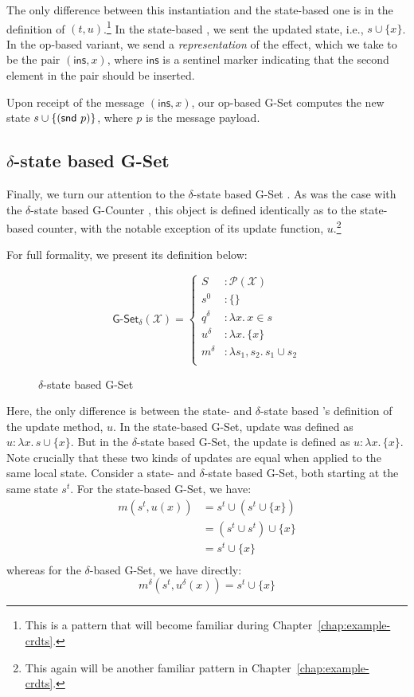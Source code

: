 The only difference between this \CRDT instantiation and the state-based one is
in the definition of $(t,u)$.\footnote{This is a pattern that will become
familiar during Chapter~\ref{chap:example-crdts}.} In the state-based \CRDT, we
sent the updated state, i.e., $s \cup \{ x \}$. In the op-based variant, we send
a \emph{representation} of the effect, which we take to be the pair
$(\textsf{ins}, x)$, where $\textsf{ins}$ is a sentinel marker indicating that
the second element in the pair should be inserted.

Upon receipt of the message $(\textsf{ins}, x)$, our op-based G-Set \CRDT
computes the new state $s \cup \{ (\textsf{snd}~p) \}$, where $p$ is the message
payload.

\subsection{$\delta$-state based G-Set}
Finally, we turn our attention to the $\delta$-state based G-Set \CRDT. As was
the case with the $\delta$-state based G-Counter \CRDT, this object is defined
identically as to the state-based counter, with the notable exception of its
update function, $u$.\footnote{This again will be another familiar pattern in
Chapter~\ref{chap:example-crdts}.}

For full formality, we present its definition below:

\begin{figure}[H]
  \centering
  \[
    \textsf{G-Set}_\delta(\mathcal{X}) = \left\{\begin{aligned}
      S &: \mathcal{P}(\mathcal{X}) \\
      s^0 &: \{ \} \\
      q^\delta &: \lambda x.\, x \in s \\
      u^\delta &: \lambda x.\, \{ x \} \\
      m^\delta &: \lambda s_1, s_2.\, s_1 \cup s_2 \\
    \end{aligned}\right.
  \]
  \caption{$\delta$-state based \textsf{G-Set} \CRDT}
\end{figure}

Here, the only difference is between the state- and $\delta$-state based \CRDT's
definition of the update method, $u$. In the state-based G-Set, update was
defined as $u : \lambda x.\, s \cup \{ x \}$. But in the $\delta$-state based
G-Set, the update is defined as $u : \lambda x.\, \{ x \}$. Note crucially that
these two kinds of updates are equal when applied to the same local state.
Consider a state- and $\delta$-state based G-Set, both starting at the same
state $s^t$. For the state-based G-Set, we have:
\[
  \begin{aligned}
    m(s^t, u(x))
      &= s^t \cup (s^t \cup \{ x \}) \\
      &= (s^t \cup s^t) \cup \{ x \} \\
      &= s^t \cup \{ x \} \\
  \end{aligned}
\]
whereas for the $\delta$-based G-Set, we have directly:
\[
  m^\delta(s^t, u^\delta(x)) = s^t \cup \{ x \}
\]
